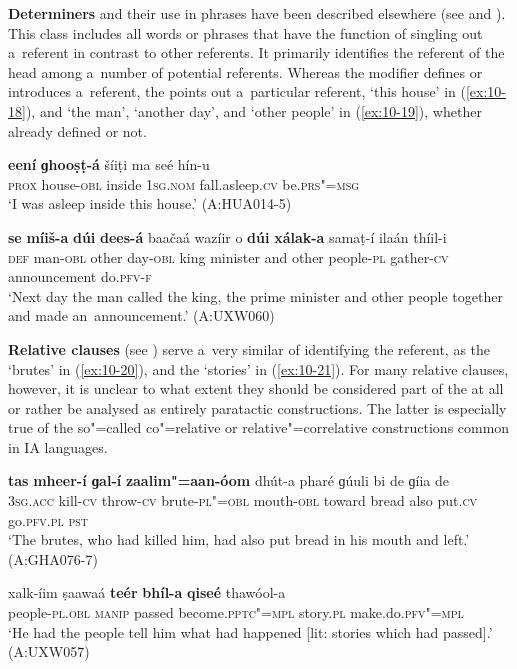 \textbf{Determiners} and their use in  phrases have been described elsewhere (see  and ). This class includes all words or phrases that have the function of singling out a~referent in contrast to other referents. It primarily identifies the referent of the  head among a~number of potential referents. Whereas the   modifier defines or introduces a~referent, the  points out a~particular referent, `this house' in (\ref{ex:10-18}), and `the man', `another day', and `other people' in (\ref{ex:10-19}), whether already defined or not.

\begin{exe}
\ex
\label{ex:10-18}
\gll \textbf{eení} \textbf{ɡhooṣṭ-á} šíiṭi ma seé hín-u\\
\textsc{prox} house-\textsc{obl} inside \textsc{1sg.nom} fall.asleep.\textsc{cv} be.\textsc{prs"=msg} \\
\glt `I was asleep inside this house.' (A:HUA014-5)

\ex
\label{ex:10-19}
\gll \textbf{se} \textbf{míiš-a} \textbf{dúi} \textbf{dees-á} baačaá wazíir o \textbf{dúi} \textbf{xálak-a} samaṭ-í ilaán thíil-i \\
\textsc{def} man-\textsc{obl} other day-\textsc{obl} king minister and other  people-\textsc{pl} gather-\textsc{cv} announcement do.\textsc{pfv-f}  \\
\glt `Next day the man called the king, the prime minister and other people together and made an~announcement.' (A:UXW060)
\end{exe}

\textbf{Relative clauses} (see ) serve a~very similar  of identifying the referent, as the `brutes' in (\ref{ex:10-20}), and the `stories' in (\ref{ex:10-21}). For many relative clauses, however, it is unclear to what extent they should be considered part of the   at all or rather be analysed as entirely paratactic constructions. The latter is especially true of the so"=called co"=relative or relative"=correlative constructions common in IA languages. 


\begin{exe}
\ex
\label{ex:10-20}
\gll \textbf{tas} \textbf{mheer-í} \textbf{ɡal-í} \textbf{zaalim"=aan-óom} dhút-a pharé ɡúuli bi de ɡíia de \\
\textsc{3sg.acc} kill-\textsc{cv} throw-\textsc{cv} brute-\textsc{pl"=obl} mouth-\textsc{obl} toward  bread also put.\textsc{cv} go.\textsc{pfv.pl} \textsc{pst} \\
\glt `The brutes, who had killed him, had also put bread in his mouth and left.' (A:GHA076-7)

\ex
\label{ex:10-21}
\gll xalk-íim ṣaawaá \textbf{teér} \textbf{bhíl-a} \textbf{qiseé} thawóol-a\\
people-\textsc{pl.obl} \textsc{manip} passed become.\textsc{pptc"=mpl} story.\textsc{pl} make.do.\textsc{pfv"=mpl}\\
\glt `He had the people tell him what had happened [lit: stories which had passed].' (A:UXW057)
\end{exe}


